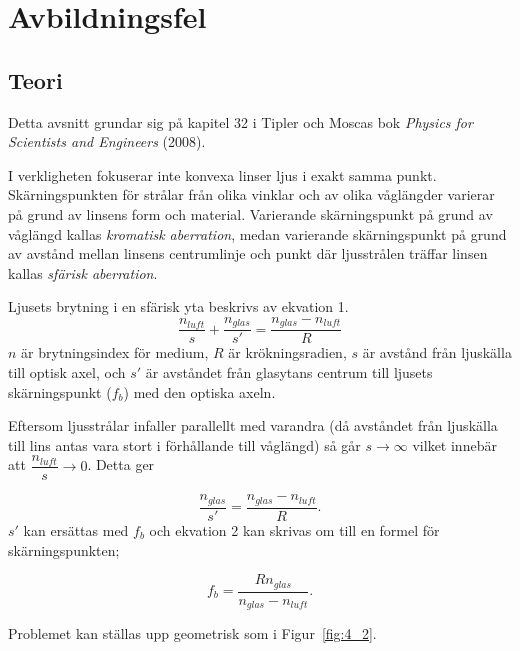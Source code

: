 \section*{\centering Avbildningsfel}

\subsection*{Teori}
Detta avsnitt grundar sig på kapitel 32 i Tipler och Moscas bok \textit{Physics for Scientists and Engineers} (2008).
\vspace{5mm}

I verkligheten fokuserar inte konvexa linser ljus i exakt samma punkt. Skärningspunkten för strålar från olika vinklar och av olika våglängder varierar på grund av linsens form och material. Varierande skärningspunkt på grund av våglängd kallas \emph{kromatisk aberration}, medan varierande skärningspunkt på grund av avstånd mellan linsens centrumlinje och punkt där ljusstrålen träffar linsen kallas \emph{sfärisk aberration}. 

Ljusets brytning i en sfärisk yta beskrivs av ekvation 1.
\begin{equation}
    \dfrac{n_{luft}}{s}+\dfrac{n_{glas}}{s'} =
    \dfrac{n_{glas} - n_{luft}}{R}
\end{equation}
$n$ är brytningsindex för medium, $R$ är krökningsradien, $s$ är avstånd från ljuskälla till optisk axel, och $s'$ är avståndet från glasytans centrum till ljusets skärningspunkt ($f_b$) med den optiska axeln.

Eftersom ljusstrålar infaller parallellt med varandra (då avståndet från ljuskälla till lins antas vara stort i förhållande till våglängd) så går $s \rightarrow \infty$ vilket innebär att $\dfrac{n_{luft}}{s} \rightarrow 0$. Detta ger

\begin{equation}
    \dfrac{n_{glas}}{s'} =
    \dfrac{n_{glas} - n_{luft}}{R}.
\end{equation}
$s'$ kan ersättas med $f_b$ och ekvation 2 kan skrivas om till en formel för skärningspunkten;

\begin{equation} \label{eq:f_b}
    f_b =
    \dfrac{Rn_{glas}}{n_{glas} - n_{luft}}.
\end{equation}

Problemet kan ställas upp geometrisk som i Figur~\ref{fig:4_2}.

